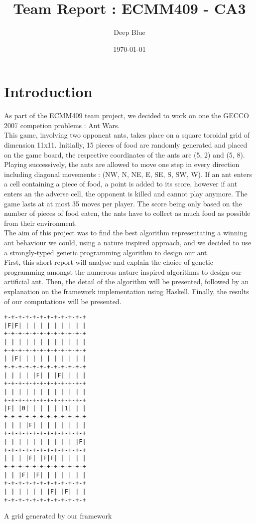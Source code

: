 \documentclass[10pt,a4paper]{article}
\begin{document}
\title{Team Report : ECMM409 - CA3}
\author {Deep Blue}
\date{\today}

\maketitle

\tableofcontents
\newpage

\section*{Introduction}

As part of the ECMM409 team project, we decided to work on one the
GECCO 2007 competion problems : Ant Wars.\\

This game, involving two opponent ants, takes place on a square
toroidal grid of dimension 11x11. Initially, 15 pieces of food are
randomly generated and placed on the game board, the respective
coordinates of the ants are (5, 2) and (5, 8). Playing successively,
the ants are allowed to move one step in every direction including
diagonal movements : (NW, N, NE, E, SE, S, SW, W). If an ant enters a
cell containing a piece of food, a point is added to its score,
however if ant enters an the adverse cell, the opponent is killed and
cannot play anymore. The game lasts at at most 35 moves per
player. The score being only based on the number of pieces of food
eaten, the ants have to collect as much food as possible from their
environment.\\

The aim of this project was to find the best algorithm representating
a winning ant behaviour we could, using a nature inspired approach,
and we decided to use a strongly-typed genetic programming algorithm
to design our ant.\\

First, this short report will analyse and explain the choice of
genetic programming amongst the numerous nature inspired algorithms to
design our artificial ant. Then, the detail of the algorithm will be
presented, followed by an explanation on the framework implementation
using Haskell. Finally, the results of our computations will be
presented.


\begin{center} 
\begin{verbatim}
+-+-+-+-+-+-+-+-+-+-+-+
|F|F| | | | | | | | | |
+-+-+-+-+-+-+-+-+-+-+-+
| | | | | | | | | | | |
+-+-+-+-+-+-+-+-+-+-+-+
| |F| | | | | | | | | |
+-+-+-+-+-+-+-+-+-+-+-+
| | | | |F| | |F| | | |
+-+-+-+-+-+-+-+-+-+-+-+
| | | | | | | | | | | |
+-+-+-+-+-+-+-+-+-+-+-+
|F| |0| | | | | |1| | |
+-+-+-+-+-+-+-+-+-+-+-+
| | | |F| | | | | | | |
+-+-+-+-+-+-+-+-+-+-+-+
| | | | | | | | | | |F|
+-+-+-+-+-+-+-+-+-+-+-+
| | | |F| |F|F| | | | |
+-+-+-+-+-+-+-+-+-+-+-+
| | |F| |F| | | | | | |
+-+-+-+-+-+-+-+-+-+-+-+
| | | | | | |F| |F| | |
+-+-+-+-+-+-+-+-+-+-+-+
\end{verbatim}
\end{center}
A grid generated by our framework
\end{document}
